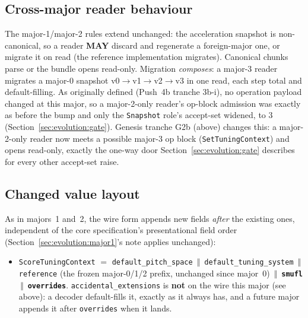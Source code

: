\documentclass[11pt,letterpaper]{report}
\newcommand{\tablenums}[1]{{\addfontfeatures{Numbers={Lining,Tabular}}#1}}
\newcommand{\MAY}{\textbf{MAY}}
\newcommand{\cat}{\ensuremath{\,\Vert\,}}
\begin{document}
\subsection{Cross-major reader behaviour}
The major-1/major-2 rules extend unchanged: the acceleration snapshot is
non-canonical, so a reader \MAY{} discard and regenerate a foreign-major one,
or migrate it on read (the reference implementation migrates). Canonical
chunks parse or the bundle opens read-only. Migration \emph{composes}: a
major-3 reader migrates a major-0 snapshot
v0${\to}$v1${\to}$v2${\to}$v3 in one read, each step total and
default-filling. As originally defined (Push~4b tranche 3b-i), no operation
payload changed at this major, so a major-2-only reader's op-block
admission was exactly as before the bump and only the \texttt{Snapshot}
role's accept-set widened, to \tablenums{3}
(Section~\ref{sec:evolution:gate}). Genesis tranche G2b (above) changes
this: a major-2-only reader now meets a possible major-3 op block
(\texttt{SetTuningContext}) and opens read-only, exactly the one-way door
Section~\ref{sec:evolution:gate} describes for every other accept-set raise.

\subsection{Changed value layout}
As in majors~1 and~2, the wire form appends new fields \emph{after} the
existing ones, independent of the core specification's presentational field
order (Section~\ref{sec:evolution:major1}'s note applies unchanged):

\begin{itemize}
  \item \texttt{ScoreTuningContext} $=$ \texttt{default\_pitch\_space} \cat{}
    \texttt{default\_tuning\_system} \cat{} \texttt{reference} (the frozen
    major-0/1/2 prefix, unchanged since major~0) \cat{}
    \textbf{\texttt{smufl}} \cat{} \textbf{\texttt{overrides}}.
    \texttt{accidental\_extensions} is \textbf{not} on the wire this major
    (see above): a decoder default-fills it, exactly as it always has, and a
    future major appends it after \texttt{overrides} when it lands.
\end{itemize}
\end{document}
